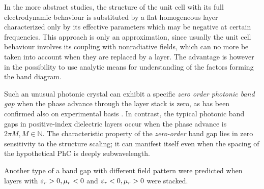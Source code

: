 % 

In the more abstract studies, the structure of the unit cell with its full electrodynamic behaviour is substituted by a flat homogeneous layer characterized only by its effective parameters which may be negative at certain frequencies. %
This approach is only an approximation, since usually the unit cell behaviour involves its coupling with nonradiative fields, which can no more be taken into account when they are replaced by a layer. The advantage is however in the possibility to use analytic means for understanding of the factors forming the band diagram.

Such an unusual photonic crystal can exhibit a specific \textit{zero order photonic band gap} \cite{chan2003, panoiu2006, chen2005} when the phase advance through the layer stack is zero, as has been confirmed also on experimental basis \cite{kocaman}. In contrast, the typical photonic band gaps in positive-index dielectric layers occur when the phase advance is $2\pi M, M\in \mathbb{N}$. The characteristic property of the \textit{zero-order} band gap lies in zero sensitivity to the structure scaling; it can manifest itself even when the spacing of the hypothetical PhC is deeply subwavelength.

Another type of a band gap with different field pattern were predicted \cite{wang2004} when layers with $\varepsilon_r>0, \mu_r<0$ and $\varepsilon_r<0, \mu_r>0$ were stacked.
%	
%

